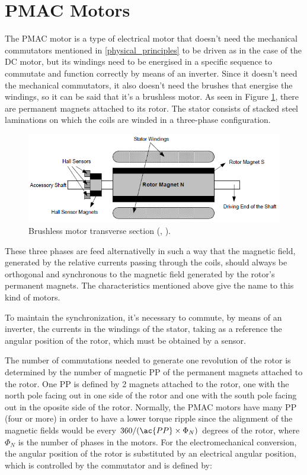 \section{PMAC Motors}

The \acf{PMAC} motor is a type of electrical motor that doesn't need the mechanical commutators mentioned in \ref{physical_principles} to be driven as in the case of the DC motor, but its windings need to be energised in a specific sequence to commutate and function correctly by means of an inverter. Since it doesn't need the mechanical commutators, it also doesn't need the brushes that energise the windings, so it can be said that it's a brushless motor. As seen in Figure \ref{fig:brushless_section}, there are permanent magnets attached to its rotor. The stator consists of stacked steel laminations on which the coils are winded in a three-phase configuration.

\begin{figure}[htbp]
	\centering
	\includegraphics[width=12cm]{Images/brushless_section.png} 
	\caption[Brushless Motor Transverse Section]{Brushless motor transverse section (\citeauthor{microchip}, \citeyear{microchip}).}
	\label{fig:brushless_section}
\end{figure}

These three phases are feed alternativelly in such a way that the magnetic field, generated by the relative currents passing through the coils, should always be orthogonal and synchronous to the magnetic field generated by the rotor's permanent magnets. The characteristics mentioned above give the name to this kind of motors. 

To maintain the synchronization, it's necessary to commute, by means of an inverter, the currents in the windings of the stator, taking as a reference the angular position of the rotor, which must be obtained by a sensor.

The number of commutations needed to generate one revolution of the rotor is determined by the number of magnetic \acf{PP} of the permanent magnets attached to the rotor. One \ac{PP} is defined by 2 magnets attached to the rotor, one with the north pole facing out in one side of the rotor and one with the south pole facing out in the oposite side of the rotor. Normally, the \ac{PMAC} motors have many \ac{PP} (four or more) in order to have a lower torque ripple since the alignment of the magnetic fields would be every $360/(\ac{PP} \times \Phi_{N})$ degrees of the rotor, where $\Phi_{N}$ is the number of phases in the motors. For the electromechanical conversion, the angular position of the rotor is substituted by an electrical angular position, which is controlled by the commutator and is defined by:

